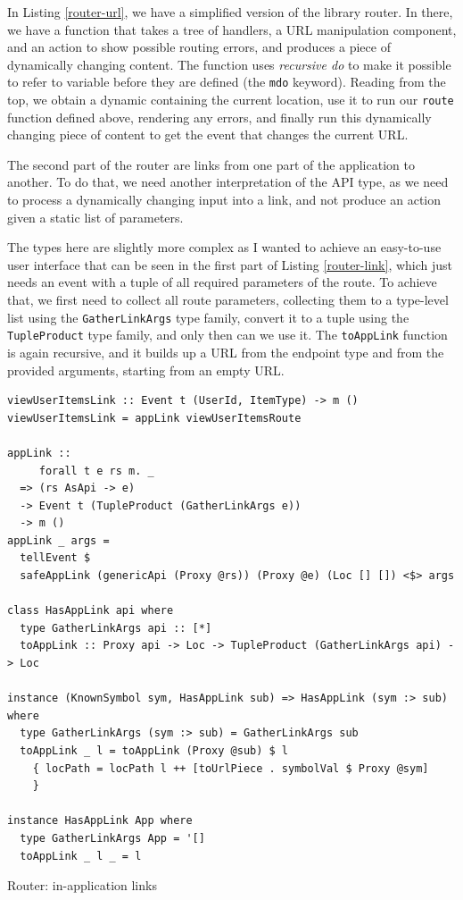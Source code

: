 \documentclass[english,zadani,odsaz]{fitthesis}
\begin{document}
In Listing \ref{router-url}, we have a simplified version of the library
router. In there, we have a function that takes a tree of handlers, a URL
manipulation component, and an action to show possible routing errors, and
produces a piece of dynamically changing content. The function uses \emph{recursive do}
to make it possible to refer to variable before they are defined (the \texttt{mdo}
keyword). Reading from the top, we obtain a dynamic containing the current
location, use it to run our \texttt{route} function defined above, rendering any errors,
and finally run this dynamically changing piece of content to get the event that
changes the current URL.

The second part of the router are links from one part of the application to
another. To do that, we need another interpretation of the API type, as we need
to process a dynamically changing input into a link, and not produce an action
given a static list of parameters.

The types here are slightly more complex as I wanted to achieve an easy-to-use
user interface that can be seen in the first part of Listing \ref{router-link},
which just needs an event with a tuple of all required parameters of the
route. To achieve that, we first need to collect all route parameters,
collecting them to a type-level list using the \texttt{GatherLinkArgs} type family,
convert it to a tuple using the \texttt{TupleProduct} type family, and only then can we
use it. The \texttt{toAppLink} function is again recursive, and it builds up a URL from
the endpoint type and from the provided arguments, starting from an empty URL.

\begin{listing}[!t]
\begin{verbatim}
viewUserItemsLink :: Event t (UserId, ItemType) -> m ()
viewUserItemsLink = appLink viewUserItemsRoute

appLink ::
     forall t e rs m. _
  => (rs AsApi -> e)
  -> Event t (TupleProduct (GatherLinkArgs e))
  -> m ()
appLink _ args =
  tellEvent $
  safeAppLink (genericApi (Proxy @rs)) (Proxy @e) (Loc [] []) <$> args

class HasAppLink api where
  type GatherLinkArgs api :: [*]
  toAppLink :: Proxy api -> Loc -> TupleProduct (GatherLinkArgs api) -> Loc

instance (KnownSymbol sym, HasAppLink sub) => HasAppLink (sym :> sub) where
  type GatherLinkArgs (sym :> sub) = GatherLinkArgs sub
  toAppLink _ l = toAppLink (Proxy @sub) $ l
    { locPath = locPath l ++ [toUrlPiece . symbolVal $ Proxy @sym]
    }

instance HasAppLink App where
  type GatherLinkArgs App = '[]
  toAppLink _ l _ = l
\end{verbatim}
\caption{Router: in-application links \label{router-link}}
\end{listing}
\end{document}
